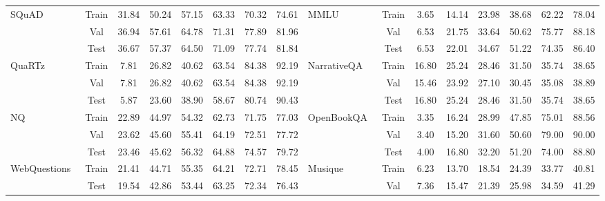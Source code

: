 \begin{table*}[h!]
{\begin{tabular}{@{}lccccccc|lccccccc@{}}
\multirow{3}{*}{SQuAD~\cite{squad}}
& Train & 31.84 & 50.24 & 57.15 & 63.33 & 70.32 & 74.61
& \multirow{3}{*}{MMLU~\cite{mmlu,mmlu_ethics}}
& Train & 3.65 & 14.14 & 23.98 & 38.68 & 62.22 & 78.04 \\ 
& Val & 36.94 & 57.61 & 64.78 & 71.31 & 77.89 & 81.96
&
& Val & 6.53 & 21.75 & 33.64 & 50.62 & 75.77 & 88.18 \\ 
& Test & 36.67 & 57.37 & 64.50 & 71.09 & 77.74 & 81.84
&
& Test & 6.53 & 22.01 & 34.67 & 51.22 & 74.35 & 86.40 \\ 
\midrule

\multirow{3}{*}{QuaRTz~\cite{tafjord-etal-2019-quartz}}
& Train & 7.81 & 26.82 & 40.62 & 63.54 & 84.38 & 92.19
& \multirow{3}{*}{NarrativeQA~\cite{narrativeqa}}
& Train & 16.80 & 25.24 & 28.46 & 31.50 & 35.74 & 38.65 \\ 
& Val & 7.81 & 26.82 & 40.62 & 63.54 & 84.38 & 92.19
&
& Val & 15.46 & 23.92 & 27.10 & 30.45 & 35.08 & 38.89 \\ 
& Test & 5.87 & 23.60 & 38.90 & 58.67 & 80.74 & 90.43
&
& Test & 16.80 & 25.24 & 28.46 & 31.50 & 35.74 & 38.65 \\ 
\midrule

\multirow{3}{*}{NQ~\cite{naturalquestion}}
& Train & 22.89 & 44.97 & 54.32 & 62.73 & 71.75 & 77.03
& \multirow{3}{*}{OpenBookQA~\cite{OpenBookQA2018}}
& Train & 3.35 & 16.24 & 28.99 & 47.85 & 75.01 & 88.56 \\ 
& Val & 23.62 & 45.60 & 55.41 & 64.19 & 72.51 & 77.72
&
& Val & 3.40 & 15.20 & 31.60 & 50.60 & 79.00 & 90.00 \\ 
& Test & 23.46 & 45.62 & 56.32 & 64.88 & 74.57 & 79.72
&
& Test & 4.00 & 16.80 & 32.20 & 51.20 & 74.00 & 88.80 \\ 
\midrule

\multirow{2}{*}{WebQuestions~\cite{webquestions}}
& Train & 21.41 & 44.71 & 55.35 & 64.21 & 72.71 & 78.45
& \multirow{2}{*}{Musique~\cite{musique}}
& Train & 6.23 & 13.70 & 18.54 & 24.39 & 33.77 & 40.81 \\ 
& Test & 19.54 & 42.86 & 53.44 & 63.25 & 72.34 & 76.43
&
& Val & 7.36 & 15.47 & 21.39 & 25.98 & 34.59 & 41.29 \\ 
\midrule


\end{tabular}}
\end{table*}
